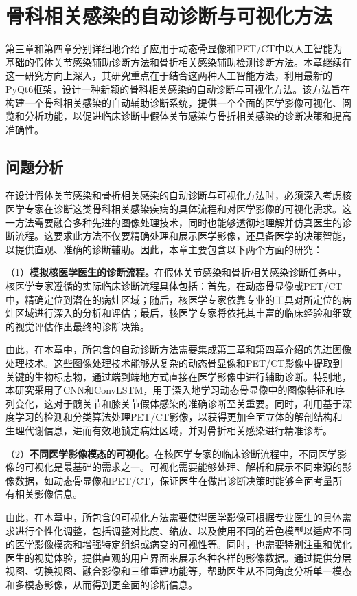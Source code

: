\chapter{骨科相关感染的自动诊断与可视化方法}

第三章和第四章分别详细地介绍了应用于动态骨显像和PET/CT中以人工智能为基础的假体关节感染辅助诊断方法和骨折相关感染辅助检测诊断方法。本章继续在这一研究方向上深入，其研究重点在于结合这两种人工智能方法，利用最新的PyQt6框架，设计一种新颖的骨科相关感染的自动诊断与可视化方法。该方法旨在构建一个骨科相关感染的自动辅助诊断系统，提供一个全面的医学影像可视化、阅览和分析功能，以促进临床诊断中假体关节感染与骨折相关感染的诊断决策和提高准确性。

\section{问题分析}

在设计假体关节感染和骨折相关感染的自动诊断与可视化方法时，必须深入考虑核医学专家在诊断这类骨科相关感染疾病的具体流程和对医学影像的可视化需求。这一方法需要融合多种先进的图像处理技术，同时也能够透彻地理解并仿真医生的诊断流程。这要求此方法不仅要精确处理和展示医学影像，还具备医学的决策智能，以提供直观、准确的诊断辅助。因此，本章主要包含以下两个方面的研究：

（1）\textbf{模拟核医学医生的诊断流程。}在假体关节感染和骨折相关感染诊断任务中，核医学专家遵循的实际临床诊断流程具体包括：首先，在动态骨显像或PET/CT中，精确定位到潜在的病灶区域；随后，核医学专家依靠专业的工具对所定位的病灶区域进行深入的分析和评估；最后，核医学专家将依托其丰富的临床经验和细致的视觉评估作出最终的诊断决策。

由此，在本章中，所包含的自动诊断方法需要集成第三章和第四章介绍的先进图像处理技术。这些图像处理技术能够从复杂的动态骨显像和PET/CT影像中提取到关键的生物标志物，通过端到端地方式直接在医学影像中进行辅助诊断。特别地，本研究采用了CNN和ConvLSTM，用于深入地学习动态骨显像中的图像特征和序列变化，这对于髋关节和膝关节假体感染的准确诊断至关重要。同时，利用基于深度学习的检测和分类算法处理PET/CT影像，以获得更加全面立体的解剖结构和生理代谢信息，进而有效地锁定病灶区域，并对骨折相关感染进行精准诊断。

（2）\textbf{不同医学影像模态的可视化。}在核医学专家的临床诊断流程中，不同医学影像的可视化是最基础的需求之一。可视化需要能够处理、解析和展示不同来源的影像数据，如动态骨显像和PET/CT，保证医生在做出诊断决策时能够全面考量所有相关影像信息。

由此，在本章中，所包含的可视化方法需要使得医学影像可根据专业医生的具体需求进行个性化调整，包括调整对比度、缩放、以及使用不同的着色模型以适应不同的医学影像模态和增强特定组织或病变的可视性等。同时，也需要特别注重和优化医生的视觉体验，提供直观的用户界面来展示各种各样的影像数据。通过提供分层视图、切换视图、融合影像和三维重建功能等，帮助医生从不同角度分析单一模态和多模态影像，从而得到更全面的诊断信息。

